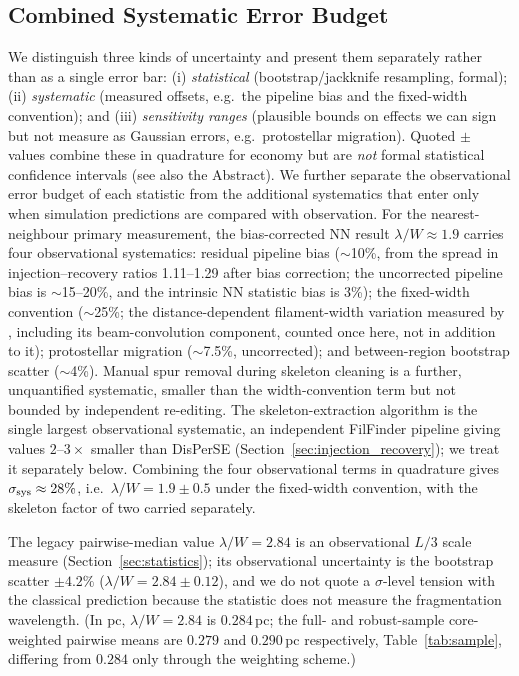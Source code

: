 \documentclass[usenatbib,twoside,twocolumn]{mnras}
\begin{document}
\subsection{Combined Systematic Error Budget}
\label{sec:error_budget}

We distinguish three kinds of uncertainty and present them separately rather than as a single error bar: (i) \emph{statistical} (bootstrap/jackknife resampling, formal); (ii) \emph{systematic} (measured offsets, e.g.\ the pipeline bias and the fixed-width convention); and (iii) \emph{sensitivity ranges} (plausible bounds on effects we can sign but not measure as Gaussian errors, e.g.\ protostellar migration). Quoted $\pm$ values combine these in quadrature for economy but are \emph{not} formal statistical confidence intervals (see also the Abstract). We further separate the observational error budget of each statistic from the additional systematics that enter only when simulation predictions are compared with observation. For the nearest-neighbour primary measurement, the bias-corrected NN result $\lambda/W\approx1.9$ carries four observational systematics: residual pipeline bias ($\sim$10\%, from the spread in injection--recovery ratios 1.11--1.29 after bias correction; the uncorrected pipeline bias is $\sim$15--20\%, and the intrinsic NN statistic bias is 3\%); the fixed-width convention ($\sim$25\%; the distance-dependent filament-width variation measured by \citealt{Panopoulou2022}, including its beam-convolution component, counted once here, not in addition to it); protostellar migration ($\sim$7.5\%, uncorrected); and between-region bootstrap scatter ($\sim$4\%). Manual spur removal during skeleton cleaning is a further, unquantified systematic, smaller than the width-convention term but not bounded by independent re-editing. The skeleton-extraction algorithm is the single largest observational systematic, an independent FilFinder pipeline giving values $2$--$3\times$ smaller than DisPerSE (Section~\ref{sec:injection_recovery}); we treat it separately below. Combining the four observational terms in quadrature gives $\sigma_{\rm sys}\approx28\%$, i.e.\ $\lambda/W=1.9\pm0.5$ under the fixed-width convention, with the skeleton factor of two carried separately.

The legacy pairwise-median value $\lambda/W=2.84$ is an observational $L/3$ scale measure (Section~\ref{sec:statistics}); its observational uncertainty is the bootstrap scatter $\pm4.2\%$ ($\lambda/W=2.84\pm0.12$), and we do not quote a $\sigma$-level tension with the classical prediction because the statistic does not measure the fragmentation wavelength. (In pc, $\lambda/W=2.84$ is $0.284$\,pc; the full- and robust-sample core-weighted pairwise means are $0.279$ and $0.290$\,pc respectively, Table~\ref{tab:sample}, differing from $0.284$ only through the weighting scheme.)
\end{document}
